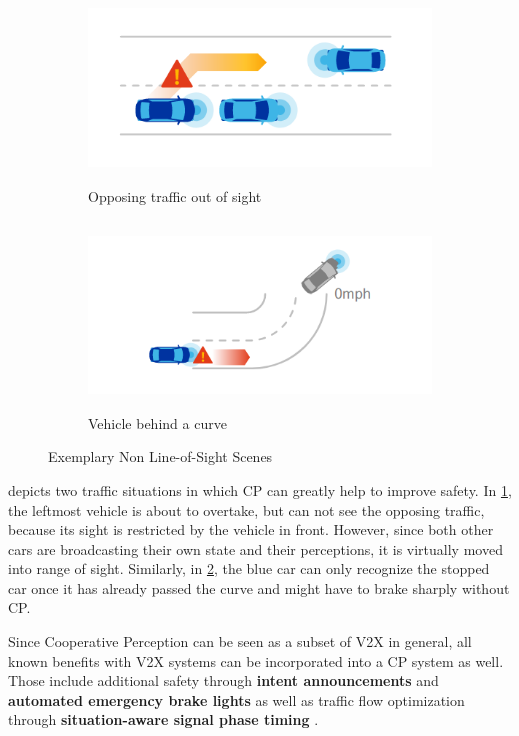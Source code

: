 \begin{figure}[h]
	
	\begin{subfigure}{0.5\textwidth}
		\includegraphics[width=1.0\linewidth, height=5cm]{98_images/nloss_2.png} 
		\caption{Opposing traffic out of sight}
		\label{fig:cp_use_cases_1}
	\end{subfigure}
	\begin{subfigure}{0.5\textwidth}
		\includegraphics[width=1.2\linewidth, height=5cm]{98_images/nloss_3.png}
		\caption{Vehicle behind a curve}
		\label{fig:cp_use_cases_2}
	\end{subfigure}
	
	\caption[Exemplary Non Line-of-Sight Scenes]{Exemplary Non Line-of-Sight Scenes \cite{QualcommTechnologiesInc.2017}}
	\label{fig:cp_use_cases}
\end{figure}

 depicts two traffic situations in which CP can greatly help to improve safety. In \cref{fig:cp_use_cases_1}, the leftmost vehicle is about to overtake, but can not see the opposing traffic, because its sight is restricted by the vehicle in front. However, since both other cars are broadcasting their own state and their perceptions, it is virtually moved into range of sight. Similarly, in \cref{fig:cp_use_cases_2}, the blue car can only recognize the stopped car once it has already passed the curve and might have to brake sharply without CP.

Since Cooperative Perception can be seen as a subset of V2X in general, all known benefits with V2X systems can be incorporated into a CP system as well. Those include additional safety through \textbf{intent announcements} and \textbf{automated emergency brake lights} as well as traffic flow optimization through \textbf{situation-aware signal phase timing} \cite{5GAutomotiveAssociation2019b}.

